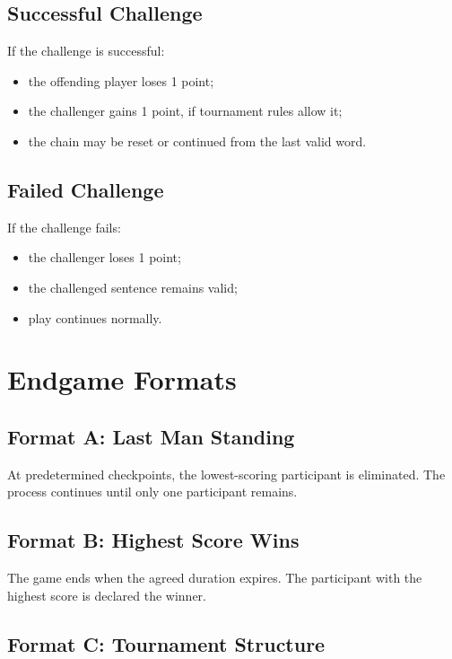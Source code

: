 \documentclass[11pt,a4paper]{article}
\begin{document}
\subsection{Successful Challenge}

If the challenge is successful:

\begin{itemize}
    \item the offending player loses 1 point;
    \item the challenger gains 1 point, if tournament rules allow it;
    \item the chain may be reset or continued from the last valid word.
\end{itemize}

\subsection{Failed Challenge}

If the challenge fails:

\begin{itemize}
    \item the challenger loses 1 point;
    \item the challenged sentence remains valid;
    \item play continues normally.
\end{itemize}

\section{Endgame Formats}

\subsection{Format A: Last Man Standing}

At predetermined checkpoints, the lowest-scoring participant is eliminated. The process continues until only one participant remains.

\subsection{Format B: Highest Score Wins}

The game ends when the agreed duration expires. The participant with the highest score is declared the winner.

\subsection{Format C: Tournament Structure}
\end{document}
